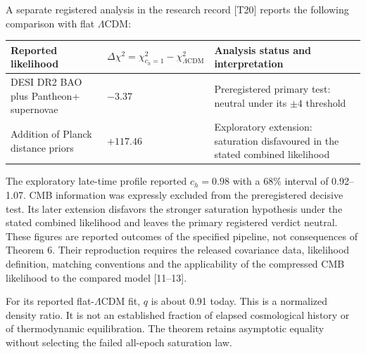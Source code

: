 \documentclass[
  11pt,
  a4paper,
]{article}
\newcounter{none} %
\begin{document}
A separate registered analysis in the research record {[}T20{]} reports the following comparison with flat \(\Lambda\)CDM:

{\def\LTcaptype{none} %
\begin{longtable}[]{@{}
  >{\raggedright\arraybackslash}p{}
  >{\raggedleft\arraybackslash}p{}
  >{\raggedright\arraybackslash}p{}@{}}
\toprule\noalign{}
\begin{minipage}[b]{\linewidth}\raggedright
Reported likelihood
\end{minipage} & \begin{minipage}[b]{\linewidth}\raggedleft
\(\Delta\chi^2=\chi^2_{c_h=1}-\chi^2_{\Lambda\mathrm{CDM}}\)
\end{minipage} & \begin{minipage}[b]{\linewidth}\raggedright
Analysis status and interpretation
\end{minipage} \\
\midrule\noalign{}
\endhead
\bottomrule\noalign{}
\endlastfoot
DESI DR2 BAO plus Pantheon+ supernovae & \(-3.37\) & Preregistered primary test: neutral under its \(\pm4\) threshold \\
Addition of Planck distance priors & \(+117.46\) & Exploratory extension: saturation disfavoured in the stated combined likelihood \\
\end{longtable}
}

The exploratory late-time profile reported \(c_h=0.98\) with a 68\% interval of 0.92--1.07. CMB information was expressly excluded from the preregistered decisive test. Its later extension disfavors the stronger saturation hypothesis under the stated combined likelihood and leaves the primary registered verdict neutral. These figures are reported outcomes of the specified pipeline, not consequences of Theorem 6. Their reproduction requires the released covariance data, likelihood definition, matching conventions and the applicability of the compressed CMB likelihood to the compared model {[}11--13{]}.

For its reported flat-\(\Lambda\)CDM fit, \(q\) is about 0.91 today. This is a normalized density ratio. It is not an established fraction of elapsed cosmological history or of thermodynamic equilibration. The theorem retains asymptotic equality without selecting the failed all-epoch saturation law.
\end{document}
